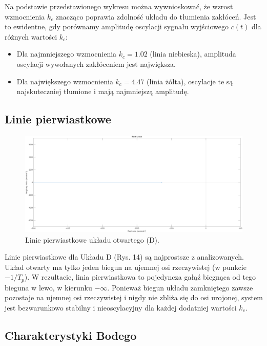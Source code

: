 \documentclass[12pt,a4paper]{article}
\begin{document}
	Na podstawie przedstawionego wykresu można wywnioskować, że wzrost wzmocnienia $k_c$ znacząco poprawia zdolność układu do tłumienia zakłóceń. Jest to ewidentne, gdy porównamy amplitudę oscylacji sygnału wyjściowego $c(t)$ dla różnych wartości $k_c$: 
	
	\begin{itemize}
		\item Dla najmniejszego wzmocnienia $k_c = 1.02$ (linia niebieska), amplituda oscylacji wywołanych zakłóceniem jest największa.
		\item Dla największego wzmocnienia $k_c = 4.47$ (linia żółta), oscylacje te są najskuteczniej tłumione i mają najmniejszą amplitudę.
	\end{itemize}
	
	\subsection{Linie pierwiastkowe}
	
	\begin{figure}[H]
		\centering
		\includegraphics[width=0.8\linewidth]{zdjecia/LP_ukladD.png}
		\caption{Linie pierwiastkowe układu otwartego (D).}
		\label{fig:LP_ukladD}
	\end{figure}
	
	Linie pierwiastkowe dla Układu D (Rys. 14) są najprostsze z analizowanych. Układ otwarty ma tylko jeden biegun na ujemnej osi rzeczywistej (w punkcie $-1/T_p$). W rezultacie, linia pierwiastkowa to pojedyncza gałąź biegnąca od tego bieguna w lewo, w kierunku $-\infty$. Ponieważ biegun układu zamkniętego zawsze pozostaje na ujemnej osi rzeczywistej i nigdy nie zbliża się do osi urojonej, system jest bezwarunkowo stabilny i nieoscylacyjny dla każdej dodatniej wartości $k_c$.
	
	\subsection{Charakterystyki Bodego}
	
\end{document}
